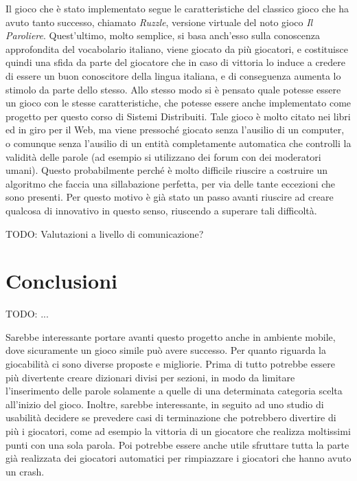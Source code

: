 \documentclass[10.5pt]{article}
\begin{document}
Il gioco che è stato implementato segue le caratteristiche del classico gioco che ha avuto tanto successo, chiamato \textit{Ruzzle}, versione virtuale del noto gioco \textit{Il Paroliere}. Quest'ultimo, molto semplice, si basa anch'esso sulla conoscenza approfondita del vocabolario italiano, viene giocato da più giocatori, e costituisce quindi una sfida da parte del giocatore che in caso di vittoria lo induce a credere di essere un buon conoscitore della lingua italiana, e di conseguenza aumenta lo stimolo da parte dello stesso. Allo stesso modo si è pensato quale potesse essere un gioco con le stesse caratteristiche, che potesse essere anche implementato come progetto per questo corso di Sistemi Distribuiti. Tale gioco è molto citato nei libri ed in giro per il Web, ma viene pressoché giocato senza l'ausilio di un computer, o comunque senza l'ausilio di un entità completamente automatica che controlli la validità delle parole (ad esempio si utilizzano dei forum con dei moderatori umani). Questo probabilmente perché è molto difficile riuscire a costruire un algoritmo che faccia una sillabazione perfetta, per via delle tante eccezioni che sono presenti. Per questo motivo è già stato un passo avanti riuscire ad creare qualcosa di innovativo in questo senso, riuscendo a superare tali difficoltà.

TODO: Valutazioni a livello di comunicazione?

\section{Conclusioni}

TODO: ...

Sarebbe interessante portare avanti questo progetto anche in ambiente mobile, dove sicuramente un gioco simile può avere successo. Per quanto riguarda la giocabilità ci sono diverse proposte e migliorie. Prima di tutto potrebbe essere più divertente creare dizionari divisi per sezioni, in modo da limitare l'inserimento delle parole solamente a quelle di una determinata categoria scelta all'inizio del gioco. Inoltre, sarebbe interessante, in seguito ad uno studio di usabilità decidere se prevedere casi di terminazione che potrebbero divertire di più i giocatori, come ad esempio la vittoria di un giocatore che realizza moltissimi punti con una sola parola. Poi potrebbe essere anche utile sfruttare tutta la parte già realizzata dei giocatori automatici per rimpiazzare i giocatori che hanno avuto un crash.




\end{document}
